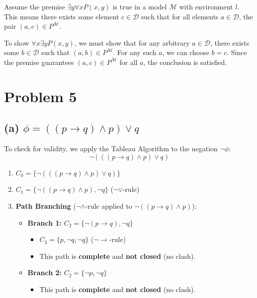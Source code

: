 \documentclass[12pt]{article}
\begin{document}
\begin{tcolorbox}[title=Proof Sketch]
    Assume the premise $\exists y \forall x P(x,y)$ is true in a model $\mathcal{M}$ with environment $l$. This means there exists some element $c \in \mathcal{D}$ such that for all elements $a \in \mathcal{D}$, the pair $(a, c) \in P^{\mathcal{M}}$. 
    
    To show $\forall x \exists y P(x,y)$, we must show that for any arbitrary $a \in \mathcal{D}$, there exists some $b \in \mathcal{D}$ such that $(a, b) \in P^{\mathcal{M}}$. For any such $a$, we can choose $b = c$. Since the premise guarantees $(a, c) \in P^{\mathcal{M}}$ for all $a$, the conclusion is satisfied.
\end{tcolorbox}

\newpage
\section*{Problem 5}

\subsection*{(a) $\phi = ((p \rightarrow q) \wedge p) \vee q$}

To check for validity, we apply the Tableau Algorithm to the negation $\neg\phi$:
$$\neg (((p \rightarrow q) \wedge p) \vee q)$$

\begin{tcolorbox}[title=Tableau Path for $\neg\phi$]
\begin{enumerate}
    \item $C_0 = \{ \neg (((p \rightarrow q) \wedge p) \vee q) \}$
    \item $C_1 = \{ \neg ((p \rightarrow q) \wedge p), \neg q \}$ \hfill ($\neg\vee$-rule)
    \item \textbf{Path Branching} ($\neg\wedge$-rule applied to $\neg ((p \rightarrow q) \wedge p)$):
    \begin{itemize}
        \item \textbf{Branch 1:} $C_2 = \{ \neg (p \rightarrow q), \neg q \}$
            \begin{itemize}
                \item $C_3 = \{ p, \neg q, \neg q \}$ \hfill ($\neg\rightarrow$-rule)
                \item This path is \textbf{complete} and \textbf{not closed} (no clash).
            \end{itemize}
        \item \textbf{Branch 2:} $C_2 = \{ \neg p, \neg q \}$
            \begin{itemize}
                \item This path is \textbf{complete} and \textbf{not closed} (no clash).
            \end{itemize}
    \end{itemize}
\end{enumerate}
\end{tcolorbox}
\end{document}
